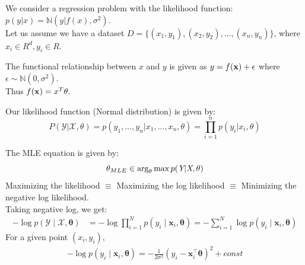 \documentclass[handout]{beamer}
\begin{document}
\begin{frame}
We consider a regression problem with the likelihood function: $p(y|x) = \mathbb{N}(y|f(x), \sigma^2)$.\\
Let us assume we have a dataset $D = \{(x_1, y_1), (x_2,y_2), \ldots, (x_n, y_n)\}$, where $x_i\in R^d, y_i\in R$. 
\end{frame}

\begin{frame}
The functional relationship between $x$ and $y$ is given as $y = f(\bold{x})+\epsilon$ where $\epsilon\sim \mathbb{N}(0, \sigma^2).$ \\ 
Thus $f(\bold{x}) = x^T\theta.$\\ 
\addlinespace
{}

\end{frame}


\begin{frame}
Our likelihood function (Normal distribution) is given by:
\begin{equation}
P(\mathcal{Y}|\mathcal{X},\theta) = p(y_1,\ldots,y_n|x_1,\ldots,x_n,\theta) = \prod_{i=1}^n p(y_i|x_i, \theta) 
\end{equation}

The MLE equation is given by:
\begin{equation}
    \theta_{MLE}\in \arg_{\theta} \max p(\emph{Y}|\emph{X},\theta)
\end{equation}
Maximizing the likelihood $\equiv$ Maximizing the log likelihood $\equiv$ Minimizing the negative log likelihood.\\
Taking negative log, we get:
    \begin{align*}
        -\log p(\mathcal{Y} \mid \mathcal{X}, \boldsymbol{\theta})&=-\log \prod_{i=1}^N p\left(y_i \mid \boldsymbol{x}_i, \boldsymbol{\theta}\right)=-\sum_{i=1}^N \log p\left(y_i \mid \boldsymbol{x}_i, \boldsymbol{\theta}\right)
    \end{align*}
    For a given point $(x_i, y_i),$
    \begin{align*}
         -\log p\left(y_i \mid \boldsymbol{x}_i, \boldsymbol{\theta}\right)=-\frac{1}{2 \sigma^2}\left(y_i-\boldsymbol{x}_i^{\top} \boldsymbol{\theta}\right)^2+ const
    \end{align*}
\end{frame}
\end{document}
